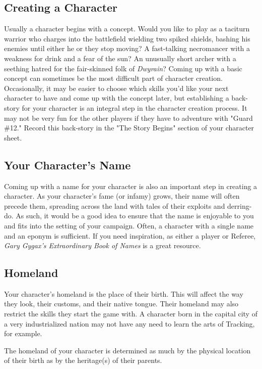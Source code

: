 \documentclass[oneside]{book}
\begin{document}
 \newpage
\begin{multicols}{2}
\section{Creating a Character}
Usually a character begins with a concept. Would you like to play as a taciturn warrior who charges into the battlefield wielding two spiked shields, bashing his enemies until either he or they stop moving? A fast-talking necromancer with a weakness for drink and a fear of the sun? An unusually short archer with a seething hatred for the fair-skinned folk of \emph{Dwyrain}?  Coming up with a basic concept can sometimes be the most difficult part of character creation. Occasionally, it may be easier to choose which skills you'd like your next character to have and come up with the concept later, but establishing a back-story for your character is an integral step in the character creation process. It may not be very fun for the other players if they have to adventure with "Guard \#12." Record this back-story in the "The Story Begins" section of your character sheet.

\subsection{Your Character's Name}
Coming up with a name for your character is also an important step in creating a character. As your character's fame (or infamy) grows, their name will often precede them, spreading across the land with tales of their exploits and derring-do. As such, it would be a good idea to ensure that the name is enjoyable to you and fits into the setting of your campaign. Often, a character with a single name and an eponym is sufficient. If you need inspiration, as either a player or Referee, \emph{Gary Gygax's Extraordinary Book of Names} is a great resource.

\subsection{Homeland}
Your character's homeland is the place of their birth. This will affect the way they look, their customs, and their native tongue. Their homeland may also restrict the skills they start the game with. A character born in the capital city of a very industrialized nation may not have any need to learn the arts of Tracking, for example. 

The homeland of your character is determined as much by the physical location of their birth as by the heritage(s) of their parents. 


\end{multicols}
\end{document}
